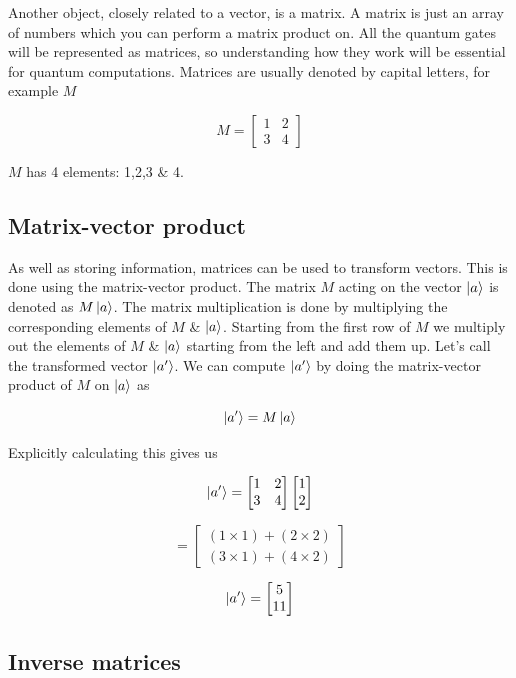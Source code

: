 \documentclass{book}
\begin{document}
Another object, closely related to a vector, is a matrix. A matrix is just an array of numbers which you can perform a matrix product on. All the quantum gates will be represented as matrices, so understanding how they work will be essential for quantum computations. Matrices are usually denoted by capital letters, for example $M$

$$
M = \begin{bmatrix} 1 & 2  \\ 3 & 4 \end{bmatrix}
$$

$M$ has 4 elements: 1,2,3 \& 4. 

\subsection{ Matrix-vector product} 

As well as storing information, matrices can be used to transform vectors. This is done using the matrix-vector product. The matrix $M$ acting on the vector $\ket{a}$ is denoted as $M\ket{a}$. The matrix multiplication is done by multiplying the corresponding elements of $M$ \& $\ket{a}$. Starting from the first row of $M$ we multiply out the elements of $M$ \& $\ket{a}$ starting from the left and add them up. Let's call the transformed vector $\ket{a'}$. We can compute $\ket{a'}$ by doing the matrix-vector product of $M$ on $\ket{a}$ as

$$
\ket{a'} = M\ket{a}
$$

Explicitly calculating this gives us

$$
\ket{a'} =  \begin{bmatrix} 1 & 2  \\ 3 & 4 \end{bmatrix} \begin{bmatrix} 1 \\ 2 \end{bmatrix}
$$

$$
= \begin{bmatrix} (1 \times 1) + (2 \times 2) \\ (3 \times 1) + (4 \times 2) \end{bmatrix}
$$

$$
\ket{a'} = \begin{bmatrix} 5 \\ 11 \end{bmatrix}
$$

\subsection{ Inverse matrices }
\end{document}
